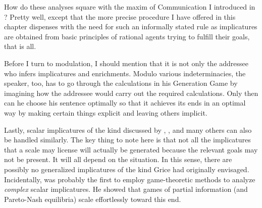 How do these analyses square with the maxim of Communication I introduced in ? Pretty well, except that the more precise procedure I have offered in this chapter dispenses with the need for such an informally stated rule as implicatures are obtained from basic principles of rational agents trying to fulfill their goals, that is all.

Before I turn to modulation, I should mention that it is not only the addressee who infers implicatures and enrichments. Modulo various indeterminacies, the speaker, too, has to go through the calculations in his Generation Game by imagining how the addressee would carry out the required calculations. Only then can he choose his sentence optimally so that it achieves its ends in an optimal way by making certain things explicit and leaving others implicit.

Lastly, scalar implicatures of the kind discussed by \citet{horn:sploe, horn:qr}, \citet{levinson:pragmatics, levinson:pm}, and many others can also be handled similarly. The key thing to note here is that not all the implicatures that a scale may license will actually be generated because the relevant goals may not be present. It will all depend on the situation. In this sense, there are possibly no generalized implicatures of the kind Grice had originally envisaged. Incidentally, \citet{ross:gip} was probably the first to employ game-theoretic methods to analyze \textit{complex} scalar implicatures. He showed that games of partial information (and Pareto-Nash equilibria) scale effortlessly toward this end.

